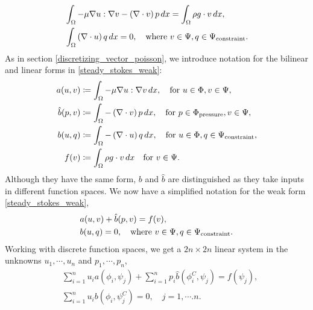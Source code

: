 \begin{equation}\label{steady_stokes_weak}
\begin{split}
    &\int_{\Omega} -\mu\nabla u : \nabla v - \left(\nabla\cdot v\right)p\,dx = \int_{\Omega} \rho g\cdot v\,dx,\\
    &\int_{\Omega} \left(\nabla\cdot u\right) q\,dx = 0, \quad\text{where $v \in \Psi, q \in {\Psi_{\text{constraint}}}$}.
\end{split}
\end{equation}
As in section \ref{discretizing_vector_poisson}, we introduce notation for the bilinear and linear forms in \eqref{steady_stokes_weak}:
\begin{equation}
\begin{split}
    a(u, v) &\coloneqq \int_{\Omega}-\mu\nabla u : \nabla v\,dx,\quad\text{for $u \in \Phi, v \in \Psi$},\\
    \hat{b}(p, v) &\coloneqq \int_{\Omega}-\left(\nabla\cdot v\right)p\,dx,\quad\text{for $p \in {\Phi_{\text{pressure}}}, v \in \Psi$},\\
    b(u, q) &\coloneqq \int_{\Omega}-\left(\nabla\cdot u\right)q\,dx,\quad\text{for $u \in \Phi, q \in {\Psi_{\text{constraint}}}$},\\
    f(v) &\coloneqq \int_{\Omega} \rho g\cdot v\,dx\quad\text{for $v \in \Psi$}.
\end{split}
\end{equation}
Although they have the same form, $b$ and $\hat{b}$ are distinguished as they take inputs in different function spaces.
We now have a simplified notation for the weak form \eqref{steady_stokes_weak},
\begin{equation}\label{steady_stokes_weak_notation}
\begin{split}
    &a(u, v) + \hat{b}(p, v) = f(v),\\
    &b(u, q) = 0, \quad\text{where $v \in \Psi, q \in {\Psi_{\text{constraint}}}$}.
\end{split}
\end{equation}
Working with discrete function spaces, we get a $2n\times 2n$ linear system in the unknowns $u_1,\cdots,u_n$ and $p_1,\cdots,p_n$,
\begin{equation}
\begin{split}
    &\sum_{i=1}^n u_i a\left(\phi_i, \psi_j\right) + \sum_{i=1}^np_i\hat{b}\left(\phi^C_i, \psi_j\right) = f(\psi_j),\\
    &\sum_{i=1}^nu_ib\left(\phi_i, \psi^C_j\right) = 0,\quad j=1,\cdots.n.
\end{split}
\end{equation}

